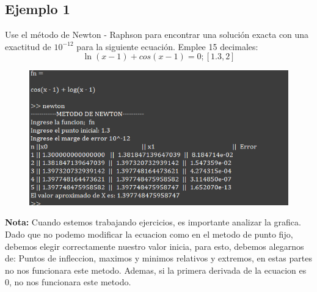 \documentclass{article}
\theoremstyle{mytheoremstyle}
\theoremstyle{mytheoremstyle}
\theoremstyle{myproblemstyle}
\begin{document}
    \subsection*{Ejemplo 1}
    Use el método de Newton - Raphson para encontrar una solución exacta con una exactitud de $10^{-12}$ para la siguiente ecuación. Emplee 15 decimales: 
    \[
        \ln(x-1)+cos(x-1)=0 ; [1.3,2]
    \]
    \begin{figure}[ht]
        \includegraphics*[scale=0.9]{img/ejemplo3.png}
    \end{figure}
    
    \textbf{Nota:} Cuando estemos trabajando ejercicios, es importante analizar la grafica. Dado que no podemo modificar la ecuacion como en el metodo de punto fijo, debemos elegir correctamente nuestro valor inicia,
    para esto, debemos alegarnos de: Puntos de infleccion, maximos y minimos relativos y extremos, en estas partes no nos funcionara este metodo.
    Ademas, si la primera derivada de la ecuacion es 0, no nos funcionara este metodo.
\end{document}

